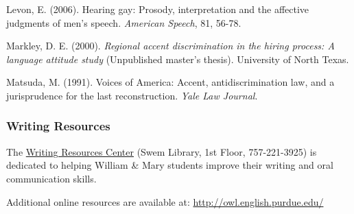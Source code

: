 \documentclass[]{article}
\begin{document}
Levon, E. (2006). Hearing gay: Prosody, interpretation and the affective judgments of men’s speech. \emph{American Speech}, 81, 56-78.

Markley, D. E. (2000). \emph{Regional accent discrimination in the hiring process: A language attitude study} (Unpublished master’s thesis). University of North Texas.

Matsuda, M. (1991). Voices of America: Accent, antidiscrimination law, and a jurisprudence for the last reconstruction. \emph{Yale Law Journal}.

\subsubsection{Writing Resources}\label{writing-resources}

The \href{http://www.wm.edu/wrc/}{Writing Resources Center} (Swem
Library, 1st Floor, 757-221-3925) is dedicated to helping William \&
Mary students improve their writing and oral communication skills.

Additional online resources are available at:
\url{http://owl.english.purdue.edu/}
\end{document}
